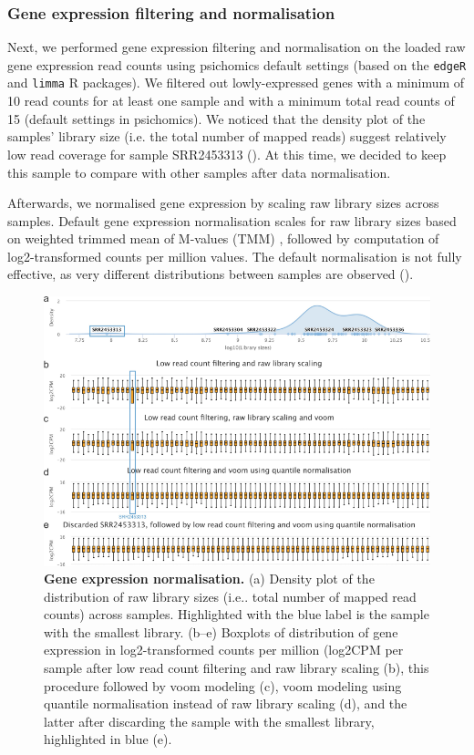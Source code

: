 \subsubsection{Gene expression filtering and normalisation}

Next, we performed gene expression filtering and normalisation on the loaded raw gene expression read counts using psichomics default settings (based on the \texttt{edgeR} \cite{robinson:2010wx} and \texttt{limma} \cite{ritchie:2015tm} R packages). We filtered out lowly-expressed genes with a minimum of 10 read counts for at least one sample and with a minimum total read counts of 15 (default settings in psichomics). We noticed that the density plot of the samples’ library size (i.e. the total number of mapped reads) suggest relatively low read coverage for sample SRR2453313 (). At this time, we decided to keep this sample to compare with other samples after data normalisation.

Afterwards, we normalised gene expression by scaling raw library sizes across samples. Default gene expression normalisation scales for raw library sizes based on weighted trimmed mean of M-values (TMM) \cite{robinson:2010wx}, followed by computation of log2-transformed counts per million values. The default normalisation is not fully effective, as very different distributions between samples are observed ().

\begin{figure}[!h]
  \includegraphics[width=1\textwidth]{images/psichomics/1-gene-expr-normalisation}
  \centering
  \caption[Gene expression normalisation]{\textbf{Gene expression normalisation.} (a) Density plot of the distribution of raw library sizes (i.e.. total number of mapped read counts) across samples. Highlighted with the blue label is the sample with the smallest library. (b–e) Boxplots of distribution of gene expression in log2-transformed counts per million (log2CPM per sample after low read count filtering and raw library scaling (b), this procedure followed by voom modeling (c), voom modeling using quantile normalisation instead of raw library scaling (d), and the latter after discarding the sample with the smallest library, highlighted in blue (e).}
  \label{fig:psichomics-ge-norm}
\end{figure}

